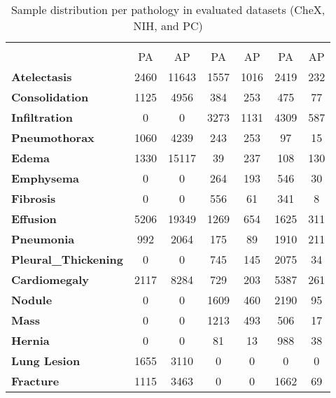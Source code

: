 \documentclass[authoryear,preprint,review,12pt]{elsarticle}
\begin{document}
\begin{table}[htbp]
\centering
\caption[Sample Distribution Per Pathology in Evaluated Datasets (CheX, NIH, and PC)]{Sample distribution per pathology in evaluated datasets (CheX, NIH, and PC)}%
\label{tab:taxonomy.table.2.datasets.ninstances}
\begin{tabular}{lcccccc}
\rowcolor[HTML]{79A8A4}
\multicolumn{1}{c}{\cellcolor[HTML]{79A8A4}{\color[HTML]{FFFFFF} }} & \multicolumn{2}{c}{\cellcolor[HTML]{79A8A4}{\color[HTML]{FFFFFF} \textbf{CheXpert}}} & \multicolumn{2}{c}{\cellcolor[HTML]{79A8A4}{\color[HTML]{FFFFFF} \textbf{NIH}}} & \multicolumn{2}{c}{\cellcolor[HTML]{79A8A4}{\color[HTML]{FFFFFF} \textbf{PADCHEST}}} \\
\rowcolor[HTML]{79A8A4}
\multicolumn{1}{c}{\multirow{-2}{*}{\cellcolor[HTML]{79A8A4}{\color[HTML]{FFFFFF} \textbf{Pathologies\textbackslash{}Dataset}}}} & {\color[HTML]{FFFFFF} PA} & {\color[HTML]{FFFFFF} AP} & {\color[HTML]{FFFFFF} PA} & {\color[HTML]{FFFFFF} AP} & {\color[HTML]{FFFFFF} PA} & {\color[HTML]{FFFFFF} AP} \\
\textbf{Atelectasis} & 2460 & 11643 & 1557 & 1016 & 2419 & 232 \\
\textbf{Consolidation} & 1125 & 4956 & 384 & 253 & 475 & 77 \\
\textbf{Infiltration} & 0 & 0 & 3273 & 1131 & 4309 & 587 \\
\textbf{Pneumothorax} & 1060 & 4239 & 243 & 253 & 97 & 15 \\
\textbf{Edema} & 1330 & 15117 & 39 & 237 & 108 & 130 \\
\textbf{Emphysema} & 0 & 0 & 264 & 193 & 546 & 30 \\
\textbf{Fibrosis} & 0 & 0 & 556 & 61 & 341 & 8 \\
\textbf{Effusion} & 5206 & 19349 & 1269 & 654 & 1625 & 311 \\
\textbf{Pneumonia} & 992 & 2064 & 175 & 89 & 1910 & 211 \\
\textbf{Pleural\_Thickening} & 0 & 0 & 745 & 145 & 2075 & 34 \\
\textbf{Cardiomegaly} & 2117 & 8284 & 729 & 203 & 5387 & 261 \\
\textbf{Nodule} & 0 & 0 & 1609 & 460 & 2190 & 95 \\
\textbf{Mass} & 0 & 0 & 1213 & 493 & 506 & 17 \\
\textbf{Hernia} & 0 & 0 & 81 & 13 & 988 & 38 \\
\textbf{Lung Lesion} & 1655 & 3110 & 0 & 0 & 0 & 0 \\
\textbf{Fracture} & 1115 & 3463 & 0 & 0 & 1662 & 69 \\

\end{tabular}
\end{table}
\end{document}
